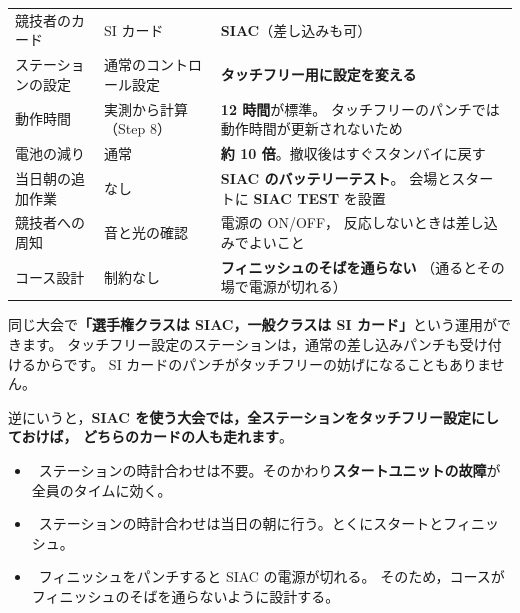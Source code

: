 \begin{center}
\small
\begin{tabular}{@{}P{30mm}P{52mm}P{58mm}@{}}
\toprule
 &  &  \\
\midrule
競技者のカード & SI カード & \textbf{SIAC}（差し込みも可） \\
ステーションの設定 & 通常のコントロール設定 & \textbf{タッチフリー用に設定を変える} \\
動作時間 & 実測から計算（Step 8） & \textbf{12 時間}が標準。
  タッチフリーのパンチでは動作時間が更新されないため \\
電池の減り & 通常 & \textbf{約 10 倍}。撤収後はすぐスタンバイに戻す \\
当日朝の追加作業 & なし & \textbf{SIAC のバッテリーテスト}。
  会場とスタートに \textbf{SIAC TEST} を設置 \\
競技者への周知 & 音と光の確認 & 電源の ON/OFF，
  反応しないときは差し込みでよいこと \\
コース設計 & 制約なし & \textbf{フィニッシュのそばを通らない}
  （通るとその場で電源が切れる） \\
\bottomrule
\end{tabular}
\end{center}

\begin{Note}[混ぜて使える]
同じ大会で\textbf{「選手権クラスは SIAC，一般クラスは SI カード」}という運用ができます。
タッチフリー設定のステーションは，通常の差し込みパンチも受け付けるからです。
SI カードのパンチがタッチフリーの妨げになることもありません。

逆にいうと，\textbf{SIAC を使う大会では，全ステーションをタッチフリー設定にしておけば，
どちらのカードの人も走れます}。
\end{Note}

\begin{Note}[押さえておきたい 3 点]
\begin{itemize}
\item \tEMIT\ ステーションの時計合わせは不要。そのかわり\textbf{スタートユニットの故障}が
      全員のタイムに効く。
\item \tSI\ ステーションの時計合わせは当日の朝に行う。とくにスタートとフィニッシュ。
\item \tSIAC\ フィニッシュをパンチすると SIAC の電源が切れる。
      そのため，コースがフィニッシュのそばを通らないように設計する。
\end{itemize}
\end{Note}

